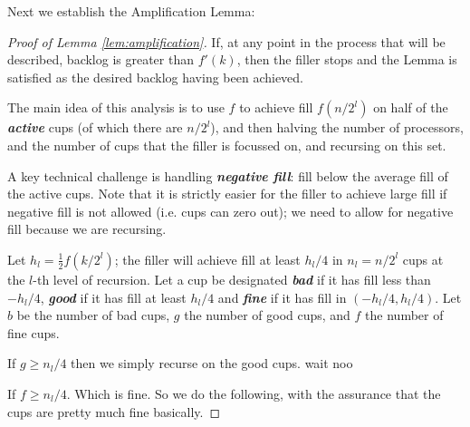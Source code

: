 \documentclass{article}[11pt]
\newcommand{\defn}[1]{{\textit{\textbf{\boldmath #1}}}}
\begin{document}
Next we establish the Amplification Lemma:
\begin{proof}[Proof of Lemma \ref{lem:amplification}]

  If, at any point in the process that will be described, backlog is greater
  than $f'(k)$, then the filler stops and the Lemma is satisfied as the desired
  backlog having been achieved.

  The main idea of this analysis is to use $f$ to achieve fill $f(n/2^l)$ on
  half of the \defn{active} cups (of which there are $n/2^l$), and then halving
  the number of processors, and the number of cups that the filler is focussed
  on, and recursing on this set. 

  A key technical challenge is handling \defn{negative fill}: fill below
  the average fill of the active cups. Note that it is strictly
  easier for the filler to achieve large fill if negative fill is not allowed
  (i.e. cups can zero out); we need to allow for negative fill because we are
  recursing. 



  Let $h_l = \frac{1}{2}f(k/2^l)$; the filler will achieve fill at least
  $h_l/4$ in $n_l = n/2^{l}$ cups at the $l$-th level of recursion. Let a cup
  be designated \defn{bad} if it has fill less than $-h_l/4$, \defn{good} if it
  has fill at least $h_l/4$ and \defn{fine} if it has fill in
  $(-h_l/4, h_l/4)$. Let $b$ be the number of bad cups, $g$
  the number of good cups, and $f$ the number of fine cups.

  If $g \ge n_l/4$ then we simply recurse on the good cups. {\color{red} wait noo}

  If $f \ge n_l/4$. Which is fine. So we do the following, with the assurance
  that the cups are pretty much fine basically.




\end{proof}
\end{document}
